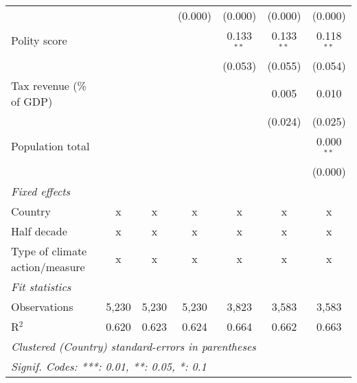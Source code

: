 \begin{tabular}{lcccccc}
                                                                                    &                &               & (0.000)       & (0.000)        & (0.000)        & (0.000)\\   
   Polity score                                                                     &                &               &               & 0.133$^{**}$   & 0.133$^{**}$   & 0.118$^{**}$\\   
                                                                                    &                &               &               & (0.053)        & (0.055)        & (0.054)\\   
   Tax revenue (\% of GDP)                                                          &                &               &               &                & 0.005          & 0.010\\   
                                                                                    &                &               &               &                & (0.024)        & (0.025)\\   
   Population total                                                                 &                &               &               &                &                & 0.000$^{**}$\\   
                                                                                    &                &               &               &                &                & (0.000)\\   
   \emph{Fixed effects}\\
   Country                                                                          & x              & x             & x             & x              & x              & x\\  
   Half decade                                                                      & x              & x             & x             & x              & x              & x\\  
   Type of climate action/measure                                                   & x              & x             & x             & x              & x              & x\\  
   \midrule \emph{Fit statistics}\\
   Observations                                                                     & 5,230          & 5,230         & 5,230         & 3,823          & 3,583          & 3,583\\  
   R$^2$                                                                            & 0.620          & 0.623         & 0.624         & 0.664          & 0.662          & 0.663\\  
   \midrule
   \multicolumn{7}{l}{\emph{Clustered (Country) standard-errors in parentheses}}\\
   \multicolumn{7}{l}{\emph{Signif. Codes: ***: 0.01, **: 0.05, *: 0.1}}\\
\end{tabular}
\par\endgroup


